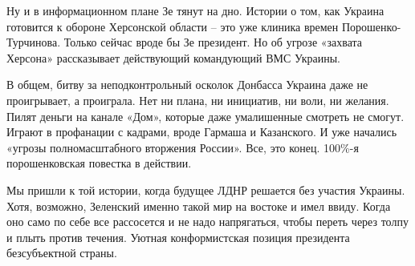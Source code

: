 Ну и в информационном плане Зе тянут на дно. Истории о том, как Украина
готовится к обороне Херсонской области – это уже клиника времен
Порошенко-Турчинова. Только сейчас вроде бы Зе президент. Но об угрозе «захвата
Херсона» рассказывает действующий командующий ВМС Украины.

В общем, битву за неподконтрольный осколок Донбасса Украина даже не
проигрывает, а проиграла. Нет ни плана, ни инициатив, ни воли, ни желания.
Пилят деньги на канале «Дом», которые даже умалишенные смотреть не смогут.
Играют в профанации с кадрами, вроде Гармаша и Казанского. И уже начались
«угрозы полномасштабного вторжения России». Все, это конец. 100\%-я
порошенковская повестка в действии.

Мы пришли к той истории, когда будущее ЛДНР решается без участия Украины. Хотя,
возможно, Зеленский именно такой мир на востоке и имел ввиду. Когда оно само по
себе все рассосется и не надо напрягаться, чтобы переть через толпу и плыть
против течения. Уютная конформистская позиция президента безсубъектной страны.


